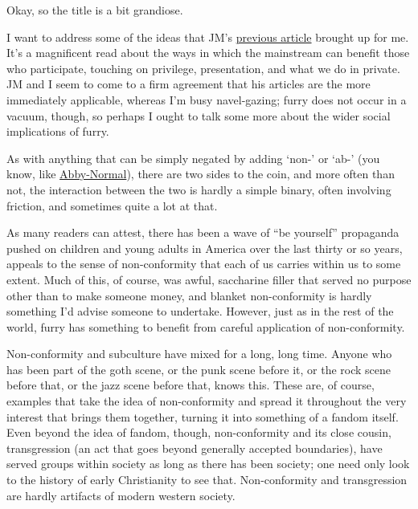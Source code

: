 Okay, so the title is a bit grandiose.

I want to address some of the ideas that JM's
\href{http://adjectivespecies.com/2013/06/17/an-argument-for-conformity/}{previous
article} brought up for me. It's a magnificent read about the ways in
which the mainstream can benefit those who participate, touching on
privilege, presentation, and what we do in private. JM and I seem to
come to a firm agreement that his articles are the more immediately
applicable, whereas I'm busy navel-gazing; furry does not occur in a
vacuum, though, so perhaps I ought to talk some more about the wider
social implications of furry.

As with anything that can be simply negated by adding `non-' or `ab-'
(you know, like
\href{http://en.wikipedia.org/wiki/Young_Frankenstein}{Abby-Normal}),
there are two sides to the coin, and more often than not, the
interaction between the two is hardly a simple binary, often involving
friction, and sometimes quite a lot at that.

As many readers can attest, there has been a wave of ``be yourself''
propaganda pushed on children and young adults in America over the last
thirty or so years, appeals to the sense of non-conformity that each of
us carries within us to some extent. Much of this, of course, was awful,
saccharine filler that served no purpose other than to make someone
money, and blanket non-conformity is hardly something I'd advise someone
to undertake. However, just as in the rest of the world, furry has
something to benefit from careful application of non-conformity.

Non-conformity and subculture have mixed for a long, long time. Anyone
who has been part of the goth scene, or the punk scene before it, or the
rock scene before that, or the jazz scene before that, knows this. These
are, of course, examples that take the idea of non-conformity and spread
it throughout the very interest that brings them together, turning it
into something of a fandom itself. Even beyond the idea of fandom,
though, non-conformity and its close cousin, transgression (an act that
goes beyond generally accepted boundaries), have served groups within
society as long as there has been society; one need only look to the
history of early Christianity to see that. Non-conformity and
transgression are hardly artifacts of modern western society.

